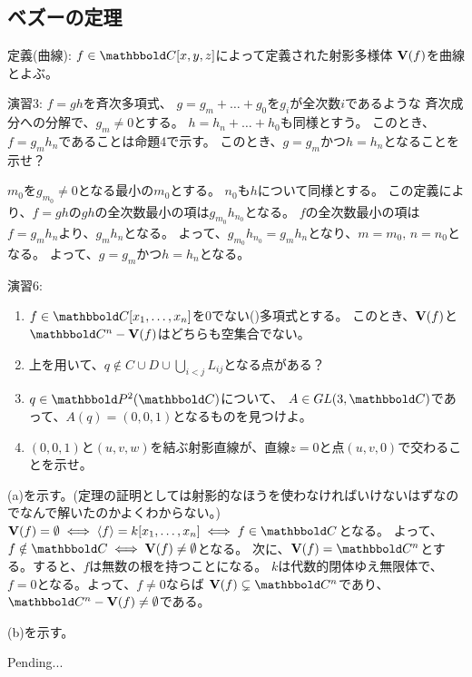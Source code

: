 \subsection{ベズーの定理}
\label{sub:ベズーの定理}

\begin{framed}
  定義(曲線):
  $f\in \C[x,y,z]$によって定義された射影多様体
  $\textbf V(f)$を曲線とよぶ。
\end{framed}

\begin{framed}
  演習3:
  $f=gh$を斉次多項式、
  $g=g_m + \dots +g_0$を$g_i$が全次数$i$であるような
  斉次成分への分解で、$g_m \neq 0$とする。
  $h = h_n + \dots + h_0$も同様とすう。
  このとき、$f=g_m h_n$であることは命題4で示す。
  このとき、$g=g_m$かつ$h=h_n$となることを示せ？
\end{framed}
\begin{myproof}
  $m_0$を$g_{m_0}\neq 0$となる最小の$m_0$とする。
  $n_0$も$h$について同様とする。
  この定義により、$f=gh$の$gh$の全次数最小の項は$g_{m_0}h_{n_0}$となる。
  $f$の全次数最小の項は$f=g_m h_n$より、$g_m h_n$となる。
  よって、$g_{m_0}h_{n_0} = g_m h_n$となり、$m=m_0,\,n=n_0$となる。
  よって、$g=g_m$かつ$h=h_n$となる。
\end{myproof}

\begin{framed}
  演習6:
  \begin{enumerate}[label=(\alph*)]
    \item
    $f\in \C[x_1,\dots,x_n]$を0でない()多項式とする。
    このとき、$\textbf V(f)$と$\C^n-\var(f)$はどちらも空集合でない。
    \item
    上を用いて、$q\notin C \cup D \cup \bigcup_{i<j} L_{ij}$となる点がある？
    \item
    $q\in \P^2(\C)$について、
    $A\in GL(3,\C)$であって、$A(q) = (0,0,1)$となるものを見つけよ。
    \item
    $(0,0,1)$と$(u,v,w)$を結ぶ射影直線が、直線$z=0$と点$(u,v,0)$で交わることを示せ。
  \end{enumerate}
\end{framed}
\begin{myproof}
  (a)を示す。(定理の証明としては射影的なほうを使わなければいけないはずなのでなんで解いたのかよくわからない。)
  $\var(f)= \emptyset \iff \gen{f} = k[x_1,\dots,x_n] \iff f\in \C$となる。
  よって、$f\notin \C \iff \var(f) \neq \emptyset$となる。
  次に、$\var(f) = \C^n$とする。すると、$f$は無数の根を持つことになる。
  $k$は代数的閉体ゆえ無限体で、$f=0$となる。よって、$f\neq 0$ならば
  $\var(f) \subsetneq \C^n$であり、$\C^n-\var(f) \neq \emptyset$である。

  (b)を示す。

  Pending...
\end{myproof}

